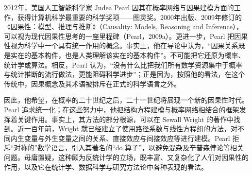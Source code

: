 2012年，美国人工智能科学家 Judea Pearl 因其在概率网络与因果建模方面的工作，获得计算机科学最重要的科学奖项——图灵奖。2000年出版、2009年修订的《因果性：模型、推理与推断》（Causality: Models, Reasoning and Inference），可以视为现代因果性思考的一座里程碑（Pearl，2009a）。更进一步，Pearl 把因果性视为科学中一个具有统一作用的概念。事实上，他在导论中认为，“因果关系既是实在的基本构件，也是人类理解该实在的基本构件”。不可能把它还原为概率、统计学或算法。相反，Pearl 认为，“没有什么比把我们所有数学资源集中于概率与统计推断的流行做法，更能阻碍科学进步”；正是因为，按照他的看法，在这个传统中，因果概念及其术语被排斥在正式的科学语言之外。

因此，他希望，在概率的二十世纪之后，二十一世纪将展现一个新的因果性时代。Pearl 追求统一化；在这些努力中，他把结构方程建模与概率网络相结合的框架发挥着关键作用。事实上，其方法的部分根源，可以在 Sewall Wright 的著作中找到。近一百年前，Wright 就已经建立了使用路径系数与线性方程组的方法，对不同内生变量与外生变量之间的关系、直接效应与间接效应等进行建模。Pearl 拒斥“对称的”数学语言，引入其著名的“do 算子”，以避免混杂及辛普森悖论等相关问题。毋庸置疑，这种颇为反统计学的立场，既丰富、又复杂化了人们对因果性的作用，以及它在统计学、数据科学与研究方法论中各种表现的看法。
